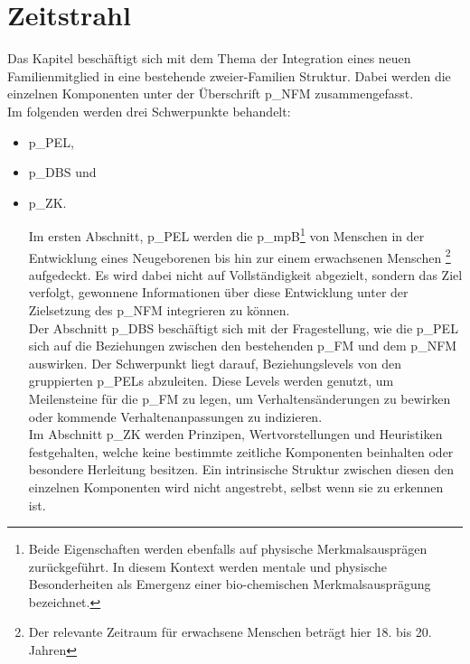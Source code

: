 

\section{Zeitstrahl}   

Das Kapitel beschäftigt sich mit dem Thema der Integration eines neuen Familienmitglied in eine bestehende zweier-Familien Struktur. Dabei werden die einzelnen Komponenten unter der Überschrift \gls{p_NFM} zusammengefasst.\\

Im folgenden werden drei Schwerpunkte behandelt: 
\begin{itemize}
	\item \gls{p_PEL},
	\item \gls{p_DBS} und
	\item \gls{p_ZK}.

Im ersten Abschnitt, \gls{p_PEL} werden die \gls{p_mpB}\footnote{Beide Eigenschaften werden ebenfalls auf physische Merkmalsausprägen zurückgeführt. In diesem Kontext werden mentale und physische Besonderheiten als Emergenz einer bio-chemischen Merkmalsausprägung bezeichnet.} von Menschen in der Entwicklung eines Neugeborenen bis hin zur einem erwachsenen Menschen \footnote{Der relevante Zeitraum für erwachsene Menschen beträgt hier 18. bis 20. Jahren} aufgedeckt. Es wird dabei nicht auf Vollständigkeit abgezielt, sondern das Ziel verfolgt, gewonnene Informationen über diese Entwicklung unter der Zielsetzung des \gls{p_NFM} integrieren zu können.\\

Der Abschnitt \gls{p_DBS} beschäftigt sich mit der Fragestellung, wie die \gls{p_PEL} sich auf die Beziehungen zwischen den bestehenden \gls{p_FM} und dem \gls{p_NFM} auswirken. Der Schwerpunkt liegt darauf, Beziehungslevels von den gruppierten \glspl{p_PEL} abzuleiten. Diese Levels werden genutzt, um Meilensteine für die \gls{p_FM} zu legen, um Verhaltensänderungen zu bewirken oder kommende Verhaltenanpassungen zu indizieren.\\

Im Abschnitt \gls{p_ZK} werden Prinzipen, Wertvorstellungen und Heuristiken festgehalten, welche keine bestimmte zeitliche Komponenten beinhalten oder besondere Herleitung besitzen. Ein intrinsische Struktur zwischen diesen den einzelnen Komponenten wird nicht angestrebt, selbst wenn sie zu erkennen ist.


\end{itemize}
